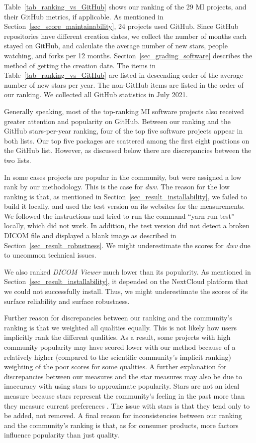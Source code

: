 \documentclass[11pt]{article}
\begin{document}
Table~\ref{tab_ranking_vs_GitHub} shows our ranking of the 29 MI projects, and
their GitHub metrics, if applicable. As mentioned in
Section~\ref{sec_score_maintainability}, 24 projects used GitHub. Since GitHub
repositories have different creation dates, we collect the number of months each
stayed on GitHub, and calculate the average number of new stars, people
watching, and forks per 12 months. Section~\ref{sec_grading_software} describes
the method of getting the creation date.  The items in
Table~\ref{tab_ranking_vs_GitHub} are listed in descending order of the average
number of new stars per year.  The non-GitHub items are listed in the order of
our ranking.  We collected all GitHub statistics in July 2021.  

Generally speaking, most of the top-ranking MI software projects also received
greater attention and popularity on GitHub. Between our ranking and the GitHub
stars-per-year ranking, four of the top five software projects appear in both
lists. Our top five packages are scattered among the first eight positions on the
GitHub list. However, as discussed below there are discrepancies between the two
lists.

In some cases projects are popular in the community, but were assigned a low
rank by our methodology.  This is the case for \textit{dwv}. The reason for the
low ranking is that, as mentioned in Section~\ref{sec_result_installability}, we
failed to build it locally, and used the test version on its websites for the
measurements. We followed the instructions and tried to run the command ``yarn
run test'' locally, which did not work. In addition, the test version did not
detect a broken DICOM file and displayed a blank image as described in
Section~\ref{sec_result_robustness}. We might underestimate the scores for
\textit{dwv} due to uncommon technical issues. 

We also ranked \textit{DICOM Viewer} much lower than its popularity. As
mentioned in Section~\ref{sec_result_installability}, it depended on the
NextCloud platform that we could not successfully install. Thus, we might
underestimate the scores of its surface reliability and surface robustness. 

Further reason for discrepancies between our ranking and the community's ranking
is that we weighted all qualities equally. This is not likely how users
implicitly rank the different qualities. As a result, some projects with high
community popularity may have scored lower with our method because of a
relatively higher (compared to the scientific community's implicit ranking)
weighting of the poor scores for some qualities. A further explanation for
discrepancies between our measures and the star measures may also be due to
inaccuracy with using stars to approximate popularity.  Stars are not an ideal
measure because stars represent the community's feeling in the past more than
they measure current preferences \citep{Szulik2017}.  The issue with stars is
that they tend only to be added, not removed.  A final reason for
inconsistencies between our ranking and the community's ranking is that, as for
consumer products, more factors influence popularity than just quality.
\end{document}
